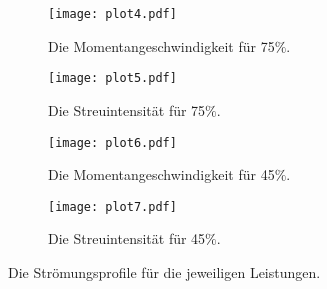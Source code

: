 \begin{figure}[H]
  \centering
  
  \begin{subfigure}{0.49\columnwidth}
  \centering
  \texttt{[image: plot4.pdf]}
  \caption{Die Momentangeschwindigkeit für 75$\%$.}
  \label{fig:p4}
  \end{subfigure}\hfill
  \begin{subfigure}{0.49\columnwidth}
  \centering
  \texttt{[image: plot5.pdf]}
  \caption{Die Streuintensität für 75$\%$.}
  \label{fig:p5}
  \end{subfigure}
  
  \medskip
  
  \begin{subfigure}{0.49\columnwidth}
  \centering
  \texttt{[image: plot6.pdf]}
  \caption{Die Momentangeschwindigkeit für 45$\%$.}
  \label{fig:p6}
  \end{subfigure}\hfill
  \begin{subfigure}{0.49\columnwidth}
  \centering
  \texttt{[image: plot7.pdf]}
  \caption{Die Streuintensität für 45$\%$.}
  \label{fig:p7}
  \end{subfigure}

  \caption{Die Strömungsprofile für die jeweiligen Leistungen.}
  \label{fig:profile}
\end{figure}

